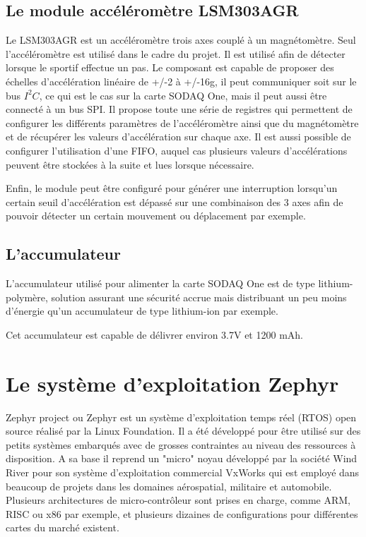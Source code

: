 
\subsection{Le module accéléromètre LSM303AGR}\label{ch:module_lsm303agr}


Le LSM303AGR est un accéléromètre trois axes couplé à un magnétomètre. Seul l'accéléromètre est utilisé dans le cadre du projet. Il est utilisé afin de détecter lorsque le sportif effectue un pas. Le composant est capable de proposer des échelles d'accélération linéaire de +/-2 à +/-16g, il peut communiquer soit sur le bus $I^{2}C$, ce qui est le cas sur la carte SODAQ One, mais il peut aussi être connecté à un bus SPI. Il propose toute une série de registres qui permettent de configurer les différents paramètres de l'accéléromètre ainsi que du magnétomètre et de récupérer les valeurs d'accélération sur chaque axe. Il est aussi possible de configurer l'utilisation d'une FIFO, auquel cas plusieurs valeurs d'accélérations peuvent être stockées à la suite et lues lorsque nécessaire.

Enfin, le module peut être configuré pour générer une interruption lorsqu'un certain seuil d'accélération est dépassé sur une combinaison des 3 axes afin de pouvoir détecter un certain mouvement ou déplacement par exemple. 

\subsection{L'accumulateur}


L'accumulateur utilisé pour alimenter la carte SODAQ One est de type lithium-polymère, solution assurant une sécurité accrue mais distribuant un peu moins d'énergie qu'un accumulateur de type lithium-ion par exemple.

Cet accumulateur est capable de délivrer environ 3.7V et 1200 mAh.


\section{Le système d'exploitation Zephyr}

Zephyr project ou Zephyr est un système d'exploitation temps réel (RTOS) open source réalisé par la Linux Foundation. Il a été développé pour être utilisé sur des petits systèmes embarqués avec de grosses contraintes au niveau des ressources à disposition. A sa base il reprend un "micro" noyau développé par la société Wind River pour son système d'exploitation commercial VxWorks qui est employé dans beaucoup de projets dans les domaines aérospatial, militaire et automobile.
Plusieurs architectures de micro-contrôleur sont prises en charge, comme ARM, RISC ou x86 par exemple, et plusieurs dizaines de configurations pour différentes cartes du marché existent. 

